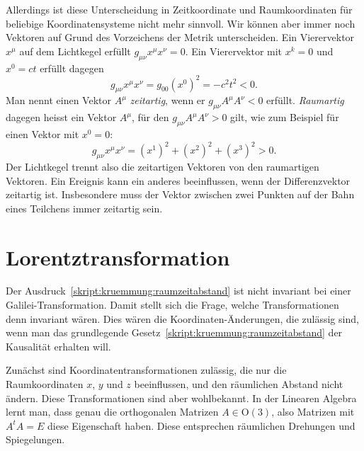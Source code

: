 Allerdings ist diese Unterscheidung in Zeitkoordinate und Raumkoordinaten
für beliebige Koordinatensysteme nicht mehr sinnvoll.
Wir können aber immer noch Vektoren auf Grund des Vorzeichens der 
Metrik unterscheiden.
Ein Vierervektor $x^\mu$ auf dem Lichtkegel erfüllt $g_{\mu\nu}x^\mu x^\nu=0$.
Ein Vierervektor  mit $x^k=0$ und $x^0=ct$ erfüllt dagegen
\[
g_{\mu\nu} x^\mu x^\nu
=
g_{00}(x^0)^2 = -c^2 t^2<0.
\]
Man nennt einen Vektor $A^\mu$ {\em zeitartig},
wenn er $g_{\mu\nu}A^\mu A^\nu<0$ 
erfüllt.
%
%
{\em Raumartig} dagegen heisst ein Vektor $A^\mu$, für den
$g_{\mu\nu} A^\mu A^\nu>0$
gilt, wie zum Beispiel für einen Vektor mit $x^0=0$:
\[
g_{\mu\nu}x^\mu x^\nu
=
(x^1)^2
+
(x^2)^2
+
(x^3)^2
>0.
\]
Der Lichtkegel trennt also die zeitartigen Vektoren von den raumartigen
Vektoren.
Ein Ereignis kann ein anderes beeinflussen, wenn der Differenzvektor
zeitartig ist.
Insbesondere muss der Vektor zwischen zwei Punkten auf der Bahn 
eines Teilchens immer zeitartig sein.

\section{Lorentztransformation%
\label{skript:speziell:section:lorentztransformation}}
Der Ausdruck~\eqref{skript:kruemmung:raumzeitabstand} ist nicht
invariant bei einer Galilei-Transformation.
Damit stellt sich die Frage, welche Transformationen denn
invariant wären.
Dies wären die Koordinaten-Änderungen, die zulässig sind, wenn
man das grundlegende Gesetz~\eqref{skript:kruemmung:raumzeitabstand}
der Kausalität erhalten will.

Zunächst sind Koordinatentransformationen zulässig, die nur die Raumkoordinaten
$x$, $y$ und $z$ beeinflussen, und den räumlichen Abstand nicht ändern.
Diese Transformationen sind aber wohlbekannt.
In der Linearen Algebra lernt man, dass genau die orthogonalen
Matrizen $A\in \textrm{O}(3)$, also Matrizen mit $A^tA=E$ diese
Eigenschaft haben.
Diese entsprechen räumlichen Drehungen und Spiegelungen.

